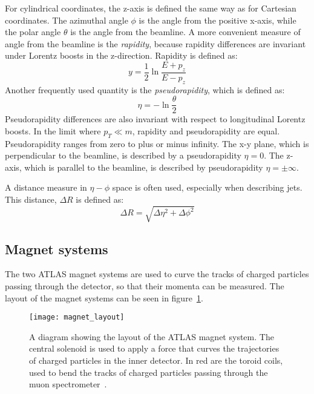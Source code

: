 For cylindrical coordinates, the z-axis is defined the same way as for Cartesian coordinates.
The azimuthal angle $\phi$ is the angle from the positive x-axis, while the polar angle $\theta$ is the angle from the beamline.
A more convenient measure of angle from the beamline is the \textit{rapidity}, because rapidity differences are invariant under Lorentz boosts in the z-direction.
Rapidity is defined as:
\begin{equation}
y = \frac{1}{2}\ln\frac{E+p_z}{E-p_z}
\end{equation}
Another frequently used quantity is the
\textit{pseudorapidity}, which is defined as:
\begin{equation}
\eta = -\ln\frac{\theta}{2}
\end{equation}
Pseudorapidity differences are also invariant with respect to longitudinal Lorentz boosts.
In the limit where $p_T \ll m$, rapidity and pseudorapidity are equal.
Pseudorapidity ranges from zero to plus or minus infinity.
The x-y plane, which is perpendicular to the beamline, is described by a pseudorapidity $\eta=0$.
The z-axis, which is parallel to the beamline, is described by pseudorapidity $\eta=\pm\infty$.

A distance measure in $\eta-\phi$ space is often used, especially when describing jets.
This distance, $\Delta R$ is defined as:
\begin{equation}
\Delta R = \sqrt{\Delta\eta^2+\Delta\phi^2}
\end{equation}

\subsection{Magnet systems}\label{subsec:magnet_systems}
The two ATLAS magnet systems are used to curve the tracks of charged particles passing through the detector,
so that their momenta can be measured. The layout of the magnet systems can be seen in figure~\ref{fig:magnet_layout}.

\begin{figure}[!ht]\centering
\texttt{[image: magnet\_layout]}
\caption{A diagram showing the layout of the ATLAS magnet system.
The central solenoid is used to apply a force that curves the trajectories of charged particles in the inner detector.
In red are the toroid coils, used to bend the tracks of charged particles passing through the muon spectrometer~\cite{atlas-detector-2008}.}
\label{fig:magnet_layout}
\end{figure}

